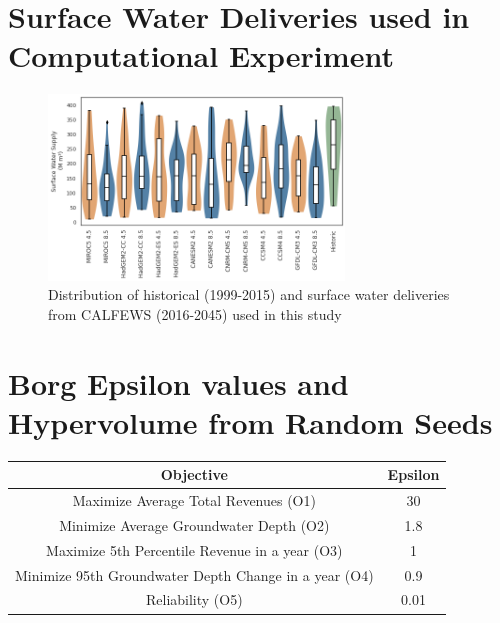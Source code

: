 \documentclass[11pt,a4paper]{article}
\begin{document}
\section{Surface Water Deliveries used in Computational Experiment}

\begin{figure}[htb!]
    \centering
    \includegraphics[width=0.7\textwidth]{./figs/gcm_surface_water.png}
    \caption{Distribution of historical (1999-2015) and surface water deliveries from CALFEWS (2016-2045) used in this study} \label{fig:SWSemitropic}
\end{figure}



\section{Borg Epsilon values and Hypervolume from Random Seeds}

\begin{center}
\begin{tabular}{ |c|c| }
 \hline
 Objective & Epsilon \\ 
 \hline
Maximize Average Total Revenues (O1) & 30  \\
Minimize Average Groundwater Depth (O2) & 1.8 \\
Maximize 5th Percentile Revenue in a year (O3) & 1 \\
Minimize 95th Groundwater Depth Change in a year (O4) & 0.9 \\
Reliability (O5) & 0.01 \\
\hline
\end{tabular}
\end{center}
\end{document}
